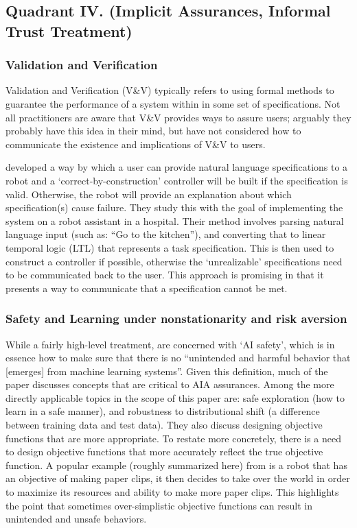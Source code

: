 \subsection{Quadrant IV. (Implicit Assurances, Informal Trust Treatment)}\label{sec:q4}

\subsubsection{Validation and Verification} \label{sec:VV}
    Validation and Verification (V\&V) typically refers to using formal methods to guarantee the performance of a system within in some set of specifications. Not all practitioners are aware that V\&V provides ways to assure users; arguably they probably have this idea in their mind, but have not considered how to communicate the existence and implications of V\&V to users.

    \citet{Raman2013-mz} developed a way by which a user can provide natural language specifications to a robot and a `correct-by-construction' controller will be built if the specification is valid. Otherwise, the robot will provide an explanation about which specification(s) cause failure. They study this with the goal of implementing the system on a robot assistant in a hospital. Their method involves parsing natural language input (such as: ``Go to the kitchen''), and converting that to linear temporal logic (LTL) that represents a task specification. This is then used to construct a controller if possible, otherwise the `unrealizable' specifications need to be communicated back to the user. This approach is promising in that it presents a way to communicate that a specification cannot be met.

\subsubsection{Safety and Learning under nonstationarity and risk aversion} \label{sec:safety}
    While a fairly high-level treatment, \citet{Amodei2016-xi} are concerned with `AI safety', which is in essence how to make sure that there is no ``unintended and harmful behavior that [emerges] from machine learning systems''. Given this definition, much of the paper discusses concepts that are critical to AIA assurances. Among the more directly applicable topics in the scope of this paper are: safe exploration (how to learn in a safe manner), and robustness to distributional shift (a difference between training data and test data). They also discuss designing objective functions that are more appropriate. To restate more concretely, there is a need to design objective functions that more accurately reflect the true objective function. A popular example (roughly summarized here) from \citet{Bostrom2014-fz} is a robot that has an objective of making paper clips, it then decides to take over the world in order to maximize its resources and ability to make more paper clips. This highlights the point that sometimes over-simplistic objective functions can result in unintended and unsafe behaviors.

